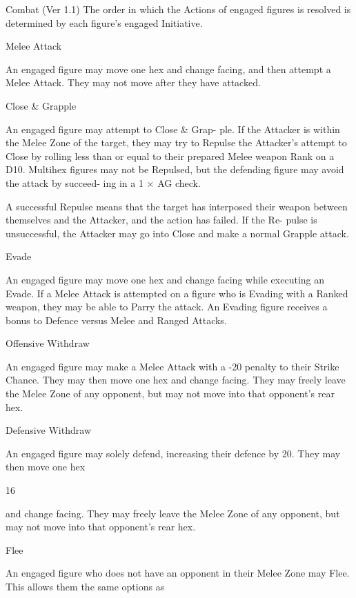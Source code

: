 \begin{Chapter}{Combat (Ver 1.1)}
The order in which the Actions of engaged figures 
is resolved is determined by each figure’s engaged 
Initiative. 

Melee Attack 

An engaged figure may move one hex and change 
facing, and then attempt a Melee Attack. They may 
not move after they have attacked. 

Close \& Grapple 

An  engaged  figure  may  attempt  to  Close  \&  Grap-
ple. If the Attacker is within the Melee Zone of the 
target,  they  may  try  to  Repulse  the  Attacker’s 
attempt  to  Close  by  rolling  less  than  or  equal  to 
their  prepared  Melee  weapon  Rank  on  a  D10. 
Multihex  figures  may  not  be  Repulsed,  but  the 
defending figure may avoid the attack by succeed-
ing in a 1 × AG check. 

A  successful  Repulse  means  that  the  target  has 
interposed  their  weapon  between  themselves  and 
the  Attacker,  and  the  action  has  failed.  If  the  Re-
pulse  is  unsuccessful,  the  Attacker  may  go  into 
Close and make a normal Grapple attack. 

Evade 

An engaged figure may move one hex and change 
facing while executing an Evade. If a Melee Attack 
is  attempted  on  a  figure  who  is  Evading  with  a 
Ranked  weapon,  they  may  be  able  to  Parry  the 
attack.  An  Evading  figure  receives  a  bonus  to 
Defence versus Melee and Ranged Attacks. 

Offensive Withdraw 

An engaged figure may make a Melee Attack with 
a  -20  penalty  to  their  Strike  Chance.  They  may 
then  move  one  hex  and  change  facing.  They  may 
freely  leave  the  Melee  Zone  of  any  opponent,  but 
may not move into that opponent’s rear hex. 

Defensive Withdraw 

An  engaged  figure  may  solely  defend,  increasing 
their defence by 20. They may then move one hex 

16 

and  change  facing.  They  may  freely  leave  the 
Melee  Zone  of  any  opponent,  but  may  not  move 
into that opponent’s rear hex. 

Flee 

An engaged figure who does not have an opponent 
in  their  Melee  Zone  may  Flee.  This  allows  them 
the same options as  


\end{Chapter}
